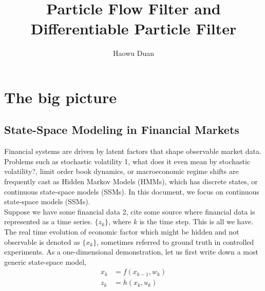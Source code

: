 \documentclass{article}
\begin{document}
\title{Particle Flow Filter and Differentiable Particle Filter}

\author{Haowu Duan}





\maketitle

\tableofcontents

\newpage
\section{The big picture}

\subsection{State-Space Modeling in Financial Markets}
Financial systems are driven by latent factors that shape observable market data. Problems such as stochastic volatility {\color{red}1, what does it even mean by stochastic volatility?}, limit order book dynamics, or macroeconomic regime shifts are frequently cast as Hidden Markov Models (HMMs), which has discrete states, or continuous state-space models (SSMs). In this document, we focus on continuous state-space models (SSMs). \\[10pt]

Suppose we have some financial data {\color{red}2, cite some source where financial data is represented as a time series.} $\{z_k\}$, where $k$ is the time step. This is all we have. The real time evolution of economic factor which might be hidden and not observable is denoted as $\{x_k\}$, sometimes referred to ground truth in controlled experiments. As a one-dimensional demonstration, let us first write down a most generic state-space model,
\begin{equation}
\begin{split} \label{Eq:SSM}
     x_k &= f(x_{k-1}, w_k) \\
     z_k &= h(x_k, u_k)
\end{split}
\end{equation}
\end{document}
